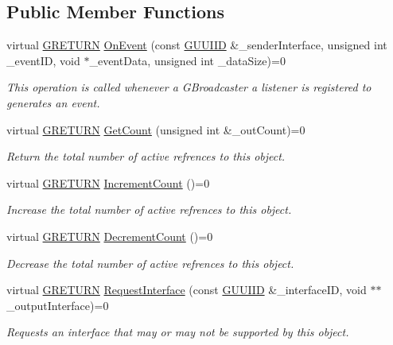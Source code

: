 \subsection*{Public Member Functions}
\begin{DoxyCompactItemize}
\item 
virtual \hyperlink{namespace_g_w_a69b1aaebac1cac8049825f035884c95b}{G\+R\+E\+T\+U\+RN} \hyperlink{class_g_w_1_1_c_o_r_e_1_1_g_listener_a72a16a96654c7a9ce301907d05b4ad45}{On\+Event} (const \hyperlink{struct_g_w_1_1_g_u_u_i_i_d}{G\+U\+U\+I\+ID} \&\+\_\+sender\+Interface, unsigned int \+\_\+event\+ID, void $\ast$\+\_\+event\+Data, unsigned int \+\_\+data\+Size)=0
\begin{DoxyCompactList}\small\item\em This operation is called whenever a G\+Broadcaster a listener is registered to generates an event. \end{DoxyCompactList}\item 
virtual \hyperlink{namespace_g_w_a69b1aaebac1cac8049825f035884c95b}{G\+R\+E\+T\+U\+RN} \hyperlink{class_g_w_1_1_c_o_r_e_1_1_g_interface_a80f212dcdf60202cf9da49405863d1d5}{Get\+Count} (unsigned int \&\+\_\+out\+Count)=0
\begin{DoxyCompactList}\small\item\em Return the total number of active refrences to this object. \end{DoxyCompactList}\item 
virtual \hyperlink{namespace_g_w_a69b1aaebac1cac8049825f035884c95b}{G\+R\+E\+T\+U\+RN} \hyperlink{class_g_w_1_1_c_o_r_e_1_1_g_interface_a3e04e58eef4f3e3f56ff7fb751194c37}{Increment\+Count} ()=0
\begin{DoxyCompactList}\small\item\em Increase the total number of active refrences to this object. \end{DoxyCompactList}\item 
virtual \hyperlink{namespace_g_w_a69b1aaebac1cac8049825f035884c95b}{G\+R\+E\+T\+U\+RN} \hyperlink{class_g_w_1_1_c_o_r_e_1_1_g_interface_af6924e12b14f217b518fc91c63d9703d}{Decrement\+Count} ()=0
\begin{DoxyCompactList}\small\item\em Decrease the total number of active refrences to this object. \end{DoxyCompactList}\item 
virtual \hyperlink{namespace_g_w_a69b1aaebac1cac8049825f035884c95b}{G\+R\+E\+T\+U\+RN} \hyperlink{class_g_w_1_1_c_o_r_e_1_1_g_interface_ab1414aa07bca310a824ee01a91657ad0}{Request\+Interface} (const \hyperlink{struct_g_w_1_1_g_u_u_i_i_d}{G\+U\+U\+I\+ID} \&\+\_\+interface\+ID, void $\ast$$\ast$\+\_\+output\+Interface)=0
\begin{DoxyCompactList}\small\item\em Requests an interface that may or may not be supported by this object. \end{DoxyCompactList}\end{DoxyCompactItemize}


